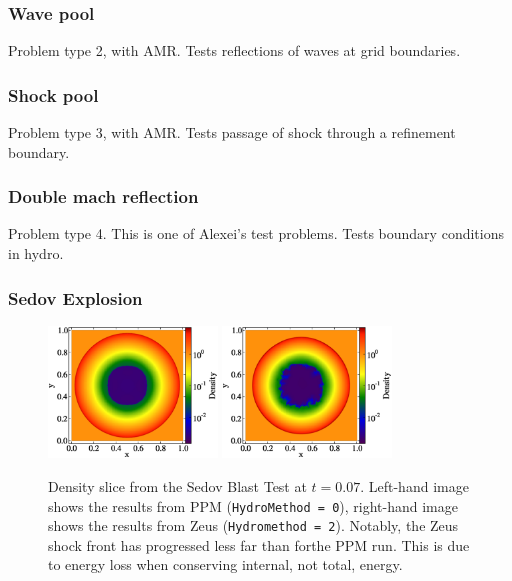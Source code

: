 \subsubsection{Wave pool}
\label{sec.tests.wavepool}
Problem type 2, with AMR.  Tests reflections of waves at grid boundaries.

\subsubsection{Shock pool}
\label{sec.tests.shockpool}
Problem type 3, with AMR.  Tests passage of shock through a refinement boundary.

\subsubsection{Double mach reflection}
\label{sec.tests.doublemach}
Problem type 4.  This is one of Alexei's test problems.  Tests
boundary conditions in hydro.

\subsubsection{Sedov Explosion}
\label{sec.tests.sedov}

\begin{figure}
\begin{center}
\includegraphics[width=0.4\textwidth]{figures/sedov-ppm-slice.eps}
\includegraphics[width=0.4\textwidth]{figures/sedov-zeus-slice.eps}
\caption{Density slice from the Sedov Blast Test at $t = 0.07$. Left-hand image shows the results from PPM ({\tt HydroMethod = 0}), right-hand image shows the results from Zeus ({\tt Hydromethod = 2}). Notably, the Zeus shock front has progressed less far than forthe PPM run. This is due to energy loss when conserving internal, not total, energy.}
\label{fig.sedov1}
\end{center}
\end{figure}


